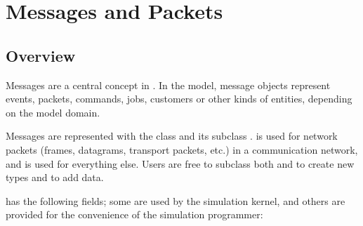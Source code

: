 \chapter{Messages and Packets}
\label{cha:messages}

\section{Overview}
\label{sec:msgs:overview}

Messages are a central concept in {\opp}. In the model, message objects
represent events, packets, commands, jobs, customers or other kinds of
entities, depending on the model domain.

Messages are represented with the  class and its subclass
.  is used for network packets (frames,
datagrams, transport packets, etc.) in a communication network, and
 is used for everything else. Users are free to subclass
both  and  to create new types and to
add data.

 has the following fields; some are used by
the simulation kernel, and others are provided for the convenience
of the simulation programmer:

